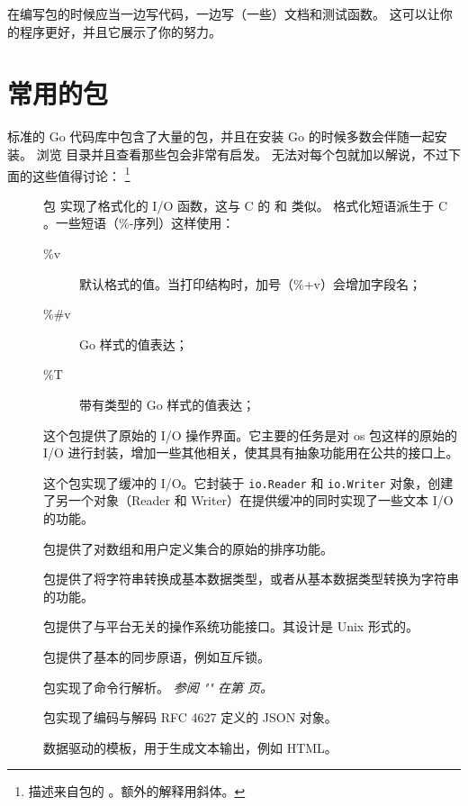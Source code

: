 \begin{lbar}
在编写包的时候应当一边写代码，一边写（一些）文档和测试函数。
这可以让你的程序更好，并且它展示了你的努力。
\end{lbar}

\section{常用的包}
标准的 Go 代码库中包含了大量的包，并且在安装 Go 的时候多数会伴随一起安装。
浏览  目录并且查看那些包会非常有启发。
无法对每个包就加以解说，不过下面的这些值得讨论：
\footnote{描述来自包的 。额外的解释用斜体。}

\begin{description}
\item[]{
包  实现了格式化的 I/O 函数，这与 C 的  和  类似。
格式化短语派生于 C 。一些短语（\%-序列）这样使用：

\begin{description}
\item[\%v]{默认格式的值。当打印结构时，加号（\%+v）会增加字段名；}
\item[\%\#v]{Go 样式的值表达；}
\item[\%T]{带有类型的 Go 样式的值表达；}
\end{description}

}

\item[]{
这个包提供了原始的 I/O 操作界面。它主要的任务是对 os 包这样的原始的 I/O 
进行封装，增加一些其他相关，使其具有抽象功能用在公共的接口上。
}
\item[]{
这个包实现了缓冲的 I/O。它封装于
\lstinline{io.Reader}
和
\lstinline{io.Writer}
对象，创建了另一个对象（Reader 和 Writer）在提供缓冲的同时实现了一些文本 I/O 的功能。
}
\item[]{
 包提供了对数组和用户定义集合的原始的排序功能。
}
\item[]{
 包提供了将字符串转换成基本数据类型，或者从基本数据类型转换为字符串的功能。
}
\item[]{
 包提供了与平台无关的操作系统功能接口。其设计是 Unix 形式的。
}
\item[]{
 包提供了基本的同步原语，例如互斥锁。
}
\item[]{
 包实现了命令行解析。
\emph{参阅 "" 在第 \pageref{sec:option parsing} 页。}
}
\item[]{
 包实现了编码与解码 RFC 4627 定义的 JSON 对象。
}
\item[]{
数据驱动的模板，用于生成文本输出，例如 HTML。

}
\end{description}
